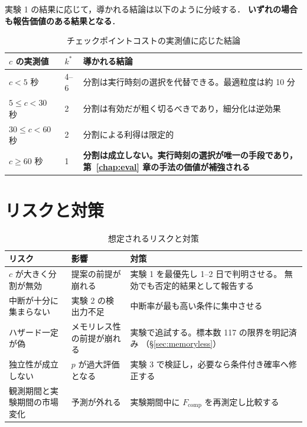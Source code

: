 \documentclass[11pt,a4paper]{ltjsreport}
\newcommand{\Fcomp}{F_{\mathrm{comp}}}
\begin{document}
実験 1 の結果に応じて，導かれる結論は以下のように分岐する．
\textbf{いずれの場合も報告価値のある結果となる}．

\begin{table}[htbp]
\centering
\caption{チェックポイントコストの実測値に応じた結論}
\label{tab:outcomes}
\small
\begin{tabularx}{\textwidth}{@{}llX@{}}
\toprule
$c$ の実測値 & $k^{*}$ & 導かれる結論 \\
\midrule
$c < 5$ 秒 & 4--6
  & 分割は実行時刻の選択を代替できる。最適粒度は約 10 分 \\
\addlinespace
$5 \leq c < 30$ 秒 & 2
  & 分割は有効だが粗く切るべきであり，細分化は逆効果 \\
\addlinespace
$30 \leq c < 60$ 秒 & 2
  & 分割による利得は限定的 \\
\addlinespace
$c \geq 60$ 秒 & 1
  & \textbf{分割は成立しない。実行時刻の選択が唯一の手段であり，
    第~\ref{chap:eval} 章の手法の価値が補強される} \\
\bottomrule
\end{tabularx}
\end{table}

\section{リスクと対策}

\begin{table}[htbp]
\centering
\caption{想定されるリスクと対策}
\label{tab:risks}
\small
\begin{tabularx}{\textwidth}{@{}XXX@{}}
\toprule
リスク & 影響 & 対策 \\
\midrule
$c$ が大きく分割が無効
  & 提案の前提が崩れる
  & 実験 1 を最優先し 1--2 日で判明させる。
    無効でも否定的結果として報告する \\
\addlinespace
中断が十分に集まらない
  & 実験 2 の検出力不足
  & 中断率が最も高い条件に集中させる \\
\addlinespace
ハザード一定が偽
  & メモリレス性の前提が崩れる
  & 実験で追試する。標本数 117 の限界を明記済み
    （\S\ref{sec:memoryless}） \\
\addlinespace
独立性が成立しない
  & $p$ が過大評価となる
  & 実験 3 で検証し，必要なら条件付き確率へ修正する \\
\addlinespace
観測期間と実験期間の市場変化
  & 予測が外れる
  & 実験期間中に $\Fcomp$ を再測定し比較する \\
\bottomrule
\end{tabularx}
\end{table}
\end{document}
